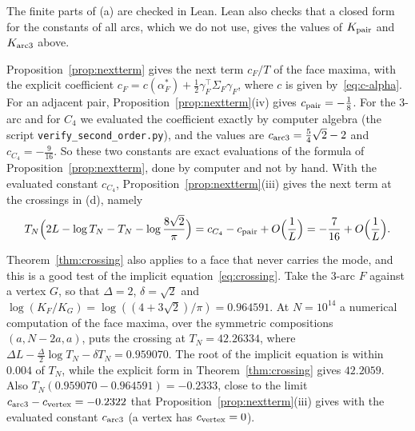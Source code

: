 The finite parts of (a) are checked in Lean. Lean also checks that a closed
form for the constants of all arcs, which we do not use, gives the values of
$K_{\rm pair}$ and $K_{\rm arc3}$ above.

Proposition~\ref{prop:nextterm} gives the next term $c_F/T$ of the face
maxima, with the explicit coefficient
$c_F=c(\alpha^*_F)+\frac12\gamma_F^\top\Sigma_F\gamma_F$, where $c$ is given
by~\eqref{eq:c-alpha}. For an adjacent pair, Proposition~\ref{prop:nextterm}(iv)
gives $c_{\rm pair}=-\frac18$. For the 3-arc and for $C_4$ we evaluated the
coefficient exactly by computer algebra (the script
\texttt{verify\_second\_order.py}), and the values are
$c_{\rm arc3}=\frac54\sqrt2-2$ and $c_{C_4}=-\frac9{16}$. So these two
constants are exact evaluations of the formula of
Proposition~\ref{prop:nextterm}, done by computer and not by hand. With the
evaluated constant $c_{C_4}$, Proposition~\ref{prop:nextterm}(iii) gives the
next term at the crossings in (d), namely
\[
 T_N\Bigl(2L-\log T_N-T_N-\log\frac{8\sqrt2}\pi\Bigr)
 =c_{C_4}-c_{\rm pair}+O\Bigl(\frac1L\Bigr)=-\frac7{16}+O\Bigl(\frac1L\Bigr).
\]

Theorem~\ref{thm:crossing} also applies to a face that never carries the mode,
and this is a good test of the implicit equation~\eqref{eq:crossing}. Take the
3-arc $F$ against a vertex $G$, so that $\Delta=2$, $\delta=\sqrt2$ and
$\log(K_F/K_G)=\log((4+3\sqrt2)/\pi)=0.964591$. At $N=10^{14}$ a numerical
computation of the face maxima, over the symmetric compositions $(a,N-2a,a)$,
puts the crossing at $T_N=42.26334$, where
$\Delta L-\frac\Delta2\log T_N-\delta T_N=0.959070$. The root of the implicit
equation is within $0.004$ of $T_N$, while the explicit form in
Theorem~\ref{thm:crossing} gives $42.2059$. Also
$T_N(0.959070-0.964591)=-0.2333$, close to the limit
$c_{\rm arc3}-c_{\rm vertex}=-0.2322$ that
Proposition~\ref{prop:nextterm}(iii) gives with the evaluated constant
$c_{\rm arc3}$ (a vertex has $c_{\rm vertex}=0$).


